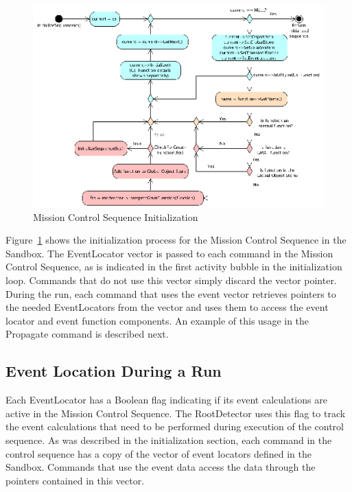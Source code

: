 \documentclass[letterpaper,10pt]{article}
\begin{document}
\begin{figure}
\begin{center}
\includegraphics[scale=1.7]{./Images/InitializeMCS.eps}
\caption{\label{fig:InitializeMCS}Mission Control Sequence Initialization}
\end{center}
\end{figure} 

Figure~\ref{fig:InitializeMCS} shows the initialization process for the Mission
Control Sequence in the Sandbox.  The EventLocator vector is passed to each
command in the Mission Control Sequence, as is indicated in the first activity
bubble in the initialization loop.  Commands that do not use this vector simply
discard the vector pointer.  During the run, each command that uses the event
vector retrieves pointers to the needed EventLocators from the vector and uses
them to access the event locator and event function components.  An example of
this usage in the Propagate command is described next.

\subsection{Event Location During a Run}

Each EventLocator has a Boolean flag indicating if its event calculations are
active in the Mission Control Sequence.  The RootDetector uses this flag to
track the event calculations that need to be performed during execution of the
control sequence. As was described in the initialization section, each command
in the control sequence has a copy of the vector of event locators defined in
the Sandbox.  Commands that use the event data access the data through the
pointers contained in this vector.  
\end{document}
